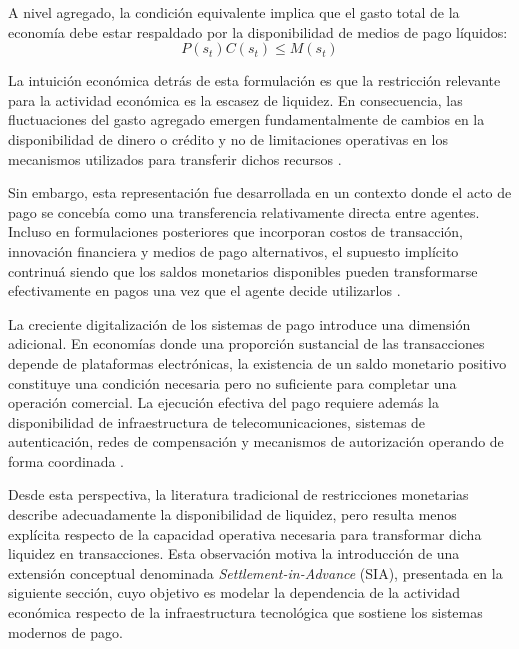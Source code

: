 A nivel agregado, la condici\'on equivalente implica que el gasto total de la 
econom\'ia debe estar respaldado por la disponibilidad de medios de pago l\'iquidos:
\begin{equation}
P(s_t)C(s_t) \leq M(s_t)
\end{equation}

La intuici\'on econ\'omica detr\'as de esta formulaci\'on es que la restricci\'on 
relevante para la actividad econ\'omica es la escasez de liquidez. En consecuencia, 
las fluctuaciones del gasto agregado emergen fundamentalmente de cambios en la 
disponibilidad de dinero o cr\'edito y no de limitaciones operativas en los 
mecanismos utilizados para transferir dichos recursos \citep{woodford2003interest, lucas1987money}.

Sin embargo, esta representaci\'on fue desarrollada en un contexto donde el acto de 
pago se conceb\'ia como una transferencia relativamente directa entre agentes. Incluso 
en formulaciones posteriores que incorporan costos de transacci\'on, innovaci\'on 
financiera y medios de pago alternativos, el supuesto impl\'icito contrinu\'a siendo 
que los saldos monetarios disponibles pueden transformarse efectivamente en pagos 
una vez que el agente decide utilizarlos \citep{lagos2005unified, alvarez2009financial, kahn2009pay}.

La creciente digitalizaci\'on de los sistemas de pago introduce una dimensi\'on 
adicional. En econom\'ias donde una proporci\'on sustancial de las transacciones 
depende de plataformas electr\'onicas, la existencia de un saldo monetario positivo 
constituye una condici\'on necesaria pero no suficiente para completar 
una operaci\'on comercial. La ejecuci\'on efectiva del pago requiere adem\'as la 
disponibilidad de infraestructura de telecomunicaciones, sistemas de autenticaci\'on, 
redes de compensaci\'on y mecanismos de autorizaci\'on operando de forma coordinada 
\citep{auer2020technology, kahn2009pay}.

Desde esta perspectiva, la literatura tradicional de restricciones monetarias describe 
adecuadamente la disponibilidad de liquidez, pero resulta menos expl\'icita respecto 
de la capacidad operativa necesaria para transformar dicha liquidez en transacciones. Esta observaci\'on motiva la introducci\'on de una extensi\'on conceptual denominada \textit{Settlement-in-Advance} (SIA), presentada en la siguiente secci\'on, cuyo objetivo es modelar la dependencia de la actividad econ\'omica respecto de la infraestructura tecnol\'ogica que sostiene los sistemas modernos de pago.

